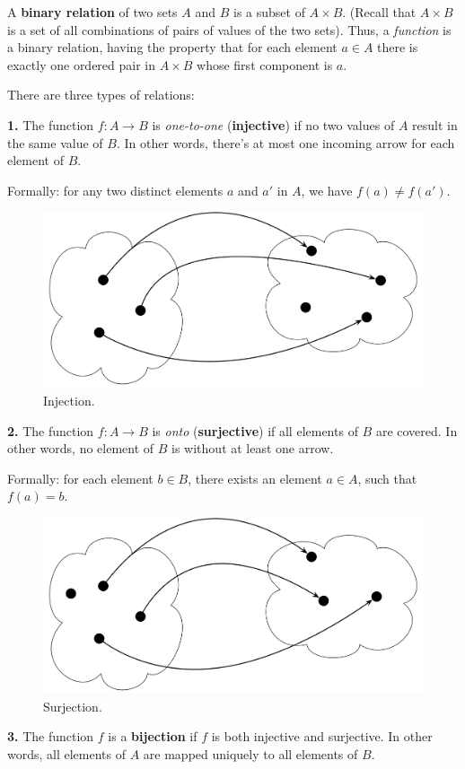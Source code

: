 \documentclass[12pt, a4paper, justified, notitlepage, sfsidenotes, notoc]{book}
\begin{document}
A \textbf{binary relation} of two sets \(A\) and \(B\) is a subset of \(A \times B\). (Recall that \(A \times B\) is a set of all combinations of pairs of values of the two sets). Thus, a \emph{function} is a binary relation, having the property that for each element \(a \in A\) there is exactly one ordered pair in \(A \times B\) whose first component is \(a\).

There are three types of relations:

\textbf{1.} The function \(f: A \rightarrow B\) is \emph{one-to-one} (\textbf{injective}) if no two values of \(A\) result in the same value of \(B\). In other words, there's at most one incoming arrow for each element of \(B\).

Formally: for any two distinct elements \(a\) and \(a'\) in \(A\), we have \(f(a) \neq f(a')\).

\begin{figure}
  \includegraphics[width=.5\linewidth,right]{images/relations/injection.png}
  \caption{Injection.}
  \label{fig:injection}
\end{figure}

\textbf{2.} The function \(f: A \rightarrow B\) is \emph{onto} (\textbf{surjective}) if all elements of \(B\) are covered. In other words, no element of \(B\) is without at least one arrow.

Formally: for each element \(b \in B\), there exists an element \(a \in A\), such that \(f(a) = b\).

\begin{figure}
  \includegraphics[width=.5\linewidth,right]{images/relations/surjection.png}
  \caption{Surjection.}
  \label{fig:surjection}
\end{figure}

\textbf{3.} The function \(f\) is a \textbf{bijection} if \(f\) is both injective and surjective. In other words, all elements of \(A\) are mapped uniquely to all elements of \(B\).
\end{document}
